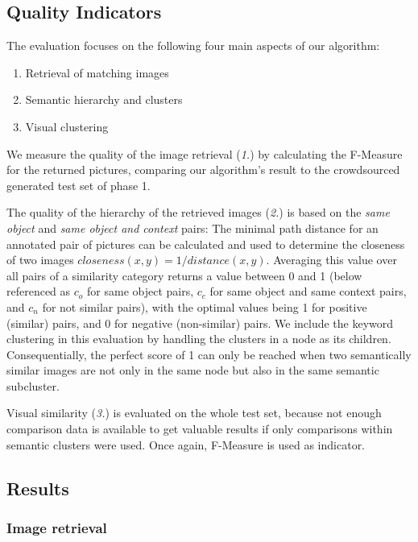 \subsection{Quality Indicators}
The evaluation focuses on the following four main aspects of our algorithm:
\begin{enumerate}
\item Retrieval of matching images
\item Semantic hierarchy and clusters
\item Visual clustering
\end{enumerate}

We measure the quality of the image retrieval (\emph{1.}) by calculating the F-Measure for the returned pictures, comparing our algorithm's result to the crowdsourced generated test set of phase 1.  

The quality of the hierarchy of the retrieved images (\emph{2.}) is based on the \emph{same object} and \emph{same object and context} pairs: The  minimal path distance for an annotated pair of pictures can be calculated and used to determine the closeness of two images $closeness(x,y) = 1/distance(x,y)$. Averaging this value over all pairs of a similarity category returns a value between 0 and 1 (below referenced as $c_o$ for same object pairs, $c_c$ for same object and same context pairs, and $c_n$ for not similar pairs), with the optimal values being 1 for positive (similar) pairs, and 0 for negative (non-similar) pairs. 
We include the keyword clustering in this evaluation by handling the clusters in a node as its children. Consequentially, the perfect score of 1 can only be reached when two semantically similar images are not only in the same node but also in the same semantic subcluster.

Visual similarity (\emph{3.}) is evaluated on the whole test set, because not enough comparison data is available to get valuable results if only comparisons within semantic clusters were used. Once again, F-Measure is used as indicator.


\subsection{Results}
\label{sec_results}

\subsubsection*{Image retrieval}

